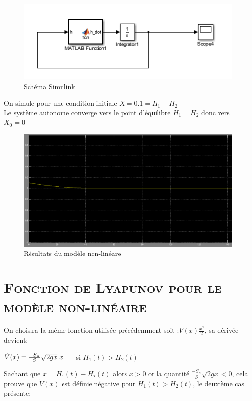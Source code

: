 \begin{figure}[H]
    \centering
    \includegraphics[width=\textwidth]{part2.PNG}
    \caption{Schéma Simulink}
    \label{fig:part2}
\end{figure}

On simule pour une condition initiale $X=0.1= H_1-H_2$\\
Le système autonome converge vers le point d'équilibre $H_1=H_2$ donc vers $X_0=0$


\begin{figure}[H]
    \centering
    \includegraphics[width=\textwidth]{autonom.PNG}
    \caption{Résultats du modèle non-linéare }
    \label{fig:autonom}
\end{figure}

	
	
\section{\textsc{Fonction de Lyapunov pour le modèle non-linéaire}}

	\par On choisira la même fonction utilisée précédemment soit :$ V(x) \frac{x^2}{2} $, sa dérivée devient:
	 
	\begin{center}
	
		$ \dot{V} (x) = \frac{-S_n}{S} \sqrt{2gx} \hspace{1mm} x  \hspace {0.5 cm} $ si $H_1(t) > H_2(t) $	
	 
	\end{center}
	\par Sachant que $x=H_1(t) - H_2(t)$ alors $x>0$ or la quantité $\frac{-S_n}{S} \sqrt{2gx}<0$, cela prouve que $\dot{V}(x)$ est définie négative pour $H_1(t) > H_2(t)$, le deuxième cas présente:  
	

